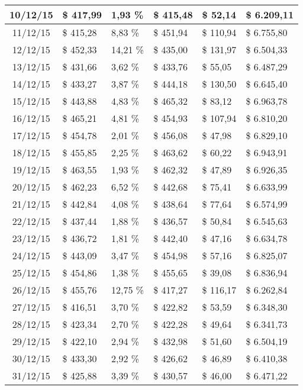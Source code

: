 \begin{small}
\begin{longtable}{|c|l|l|l|l|l|}
10/12/15 & \$ 417,99 & 1,93 \% & \$ 415,48 & \$ 52,14 & \$ 6.209,11 \\ \hline
11/12/15 & \$ 415,28 & 8,83 \% & \$ 451,94 & \$ 110,94 & \$ 6.755,80 \\ \hline
12/12/15 & \$ 452,33 & 14,21 \% & \$ 435,00 & \$ 131,97 & \$ 6.504,33 \\ \hline
13/12/15 & \$ 431,66 & 3,62 \% & \$ 433,76 & \$ 55,05 & \$ 6.487,29 \\ \hline
14/12/15 & \$ 433,27 & 3,87 \% & \$ 444,18 & \$ 130,50 & \$ 6.645,40 \\ \hline
15/12/15 & \$ 443,88 & 4,83 \% & \$ 465,32 & \$ 83,12 & \$ 6.963,78 \\ \hline
16/12/15 & \$ 465,21 & 4,81 \% & \$ 454,93 & \$ 107,94 & \$ 6.810,20 \\ \hline
17/12/15 & \$ 454,78 & 2,01 \% & \$ 456,08 & \$ 47,98 & \$ 6.829,10 \\ \hline
18/12/15 & \$ 455,85 & 2,25 \% & \$ 463,62 & \$ 60,22 & \$ 6.943,91 \\ \hline
19/12/15 & \$ 463,55 & 1,93 \% & \$ 462,32 & \$ 47,89 & \$ 6.926,35 \\ \hline
20/12/15 & \$ 462,23 & 6,52 \% & \$ 442,68 & \$ 75,41 & \$ 6.633,99 \\ \hline
21/12/15 & \$ 442,84 & 4,08 \% & \$ 438,64 & \$ 77,64 & \$ 6.574,99 \\ \hline
22/12/15 & \$ 437,44 & 1,88 \% & \$ 436,57 & \$ 50,84 & \$ 6.545,63 \\ \hline
23/12/15 & \$ 436,72 & 1,81 \% & \$ 442,40 & \$ 47,16 & \$ 6.634,78 \\ \hline
24/12/15 & \$ 443,09 & 3,47 \% & \$ 454,98 & \$ 57,16 & \$ 6.825,07 \\ \hline
25/12/15 & \$ 454,86 & 1,38 \% & \$ 455,65 & \$ 39,08 & \$ 6.836,94 \\ \hline
26/12/15 & \$ 455,76 & 12,75 \% & \$ 417,27 & \$ 116,17 & \$ 6.262,84 \\ \hline
27/12/15 & \$ 416,51 & 3,70 \% & \$ 422,82 & \$ 53,59 & \$ 6.348,30 \\ \hline
28/12/15 & \$ 423,34 & 2,70 \% & \$ 422,28 & \$ 49,64 & \$ 6.341,73 \\ \hline
29/12/15 & \$ 422,10 & 2,94 \% & \$ 432,98 & \$ 51,60 & \$ 6.504,19 \\ \hline
30/12/15 & \$ 433,30 & 2,92 \% & \$ 426,62 & \$ 46,89 & \$ 6.410,38 \\ \hline
31/12/15 & \$ 425,88 & 3,39 \% & \$ 430,57 & \$ 46,00 & \$ 6.471,22 \\ \hline

\end{longtable}
\end{small}
